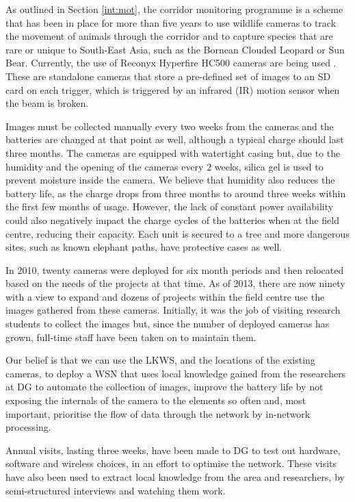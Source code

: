 As outlined in Section \ref{int:mot}, the corridor monitoring programme is a scheme that has been in place for more than five years to use wildlife cameras to track the movement of animals through the corridor and to capture species that are rare or unique to South-East Asia, such as the Bornean Clouded Leopard or Sun Bear. Currently, the use of Reconyx Hyperfire HC500 cameras are being used \cite{Reconyx}. These are standalone cameras that store a pre-defined set of images to an SD card on each trigger, which is triggered by an infrared (IR) motion sensor when the beam is broken. 

Images must be collected manually every two weeks from the cameras and the batteries are changed at that point as well, although a typical charge should last three months. The cameras are equipped with watertight casing but, due to the humidity and the opening of the cameras every 2 weeks, silica gel is used to prevent moisture inside the camera. We believe that humidity also reduces the battery life, as the charge drops from three months to around three weeks within the first few months of usage. However, the lack of constant power availability could also negatively impact the charge cycles of the batteries when at the field centre, reducing their capacity. Each unit is secured to a tree and more dangerous sites, such as known elephant paths, have protective cases as well. 

In 2010, twenty cameras were deployed for six month periods and then relocated based on the needs of the projects at that time. As of 2013, there are now ninety 	with a view to expand and dozens of projects within the field centre use the images gathered from these cameras. Initially, it was the job of visiting research students to collect the images but, since the number of deployed cameras has grown, full-time staff have been taken on to maintain them.

Our belief is that we can use the LKWS, and the locations of the existing cameras, to deploy a WSN that uses local knowledge gained from the researchers at DG to automate the collection of images, improve the battery life by not exposing the internals of the camera to the elements so often and, most important, prioritise the flow of data through the network by in-network processing. 
	
Annual visits, lasting three weeks, have been made to DG to test out hardware, software and wireless choices, in an effort to optimise the network. These visits have also been used to extract local knowledge from the area and researchers, by semi-structured interviews and watching them work.

